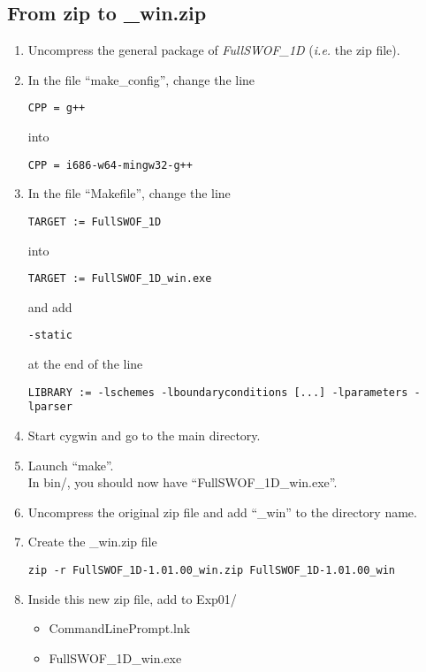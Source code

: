 \documentclass[a4paper, 11pt]{article}
\newcommand{\FullSWOFoneD}{\emph{FullSWOF\_1D}}
\begin{document}
\subsection{From zip to \_win.zip}
\begin{enumerate}
\item Uncompress the general package of \FullSWOFoneD{} (\emph{i.e.} the zip file).
\item In the file ``make\_config'', change the line
\begin{verbatim}
CPP	= g++
\end{verbatim}
into
\begin{verbatim}
CPP	= i686-w64-mingw32-g++
\end{verbatim}
\item In the file ``Makefile'', change the line
\begin{verbatim}
TARGET := FullSWOF_1D
\end{verbatim}
into
\begin{verbatim}
TARGET := FullSWOF_1D_win.exe
\end{verbatim}
and add
\begin{verbatim}
-static
\end{verbatim}
at the end of the line
\begin{verbatim}
LIBRARY := -lschemes -lboundaryconditions [...] -lparameters -lparser
\end{verbatim}
\item Start cygwin and go to the main directory.
\item Launch ``make''.\\
In bin/, you should now have ``FullSWOF\_1D\_win.exe''.
\item Uncompress the original zip file and add ``\_win'' to the directory name.
\item Create the \_win.zip file
\begin{verbatim}
zip -r FullSWOF_1D-1.01.00_win.zip FullSWOF_1D-1.01.00_win
\end{verbatim}
\item Inside this new zip file, add to Exp01/
	\begin{itemize}
		\item CommandLinePrompt.lnk
		\item FullSWOF\_1D\_win.exe

\end{itemize}
\end{enumerate}
\end{document}

